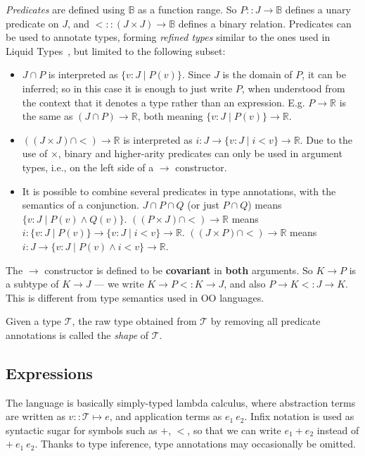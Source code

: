 \documentclass{article}
\newcommand\newterm[1]{{\it #1}}
\newcommand\R{\mathbb{R}}
\newcommand\B{\mathbb{B}}
\newcommand\T{\mathcal{T}}
\begin{document}
\medskip
\newterm{Predicates} are defined using $\B$ as a function range. So $P :: J\to\B$ defines a unary predicate
on $J$, and ${<} :: (J\times J)\to\B$ defines a binary relation.
Predicates can be used to annotate types, forming \newterm{refined types} similar to the ones
used in Liquid Types~\cite{PLDI08/Rondon}, but limited to the following subset:
\begin{itemize}
  \item $J\cap P$ is interpreted as $\{v:J\;|\;P(v)\}$. Since $J$ is the domain of $P$, it can be inferred;
    so in this case it is enough to just write $P$, when understood from the context that it denotes a
    type rather than an expression. E.g. $P\to\R$ is the same as $(J\cap P)\to\R$, both meaning
    $\{v:J\;|\;P(v)\}\to\R$.
  \item $((J\times J)\cap {<})\to\R$ is interpreted as $i:J\to\{v:J\;|\;i<v\}\to\R$. Due to the use of $\times$,
    binary and higher-arity predicates can only be used in argument types, i.e., on the left side of a $\to$
    constructor.
  \item It is possible to combine several predicates in type annotations, with the semantics of a conjunction.
    $J\cap P\cap Q$ (or just $P\cap Q$) means $\{v:J\;|\;P(v)\land Q(v)\}$.
    $((P\times J)\cap{<})\to\R$ means $i:\{v:J\;|\;P(v)\}\to\{v:J\;|\;i<v\}\to\R$.
    $((J\times P)\cap{<})\to\R$ means $i:J\to\{v:J\;|\;P(v)\land i<v\}\to\R$.
\end{itemize}

The $\to$ constructor is defined to be {\bf covariant} in {\bf both} arguments. So $K\to P$ is a subtype of $K\to J$
--- we write $K\to P <: K\to J$, and also $P\to K <: J\to K$. This is different from type semantics used in OO
languages.

Given a type $\T$, the raw type obtained from $\T$ by removing all predicate annotations
is called the \newterm{shape} of $\T$.


\subsection{Expressions}

The language is basically simply-typed lambda calculus, where abstraction terms are written as
$v::\T\mapsto e$, and application terms as $e_1\ e_2$. Infix notation is used as syntactic sugar
for symbols such as $+$, $<$, so that we can write $e_1 + e_2$ instead of ${+}\ e_1\ e_2$.
Thanks to type inference, type annotations may occasionally be omitted.
\end{document}
